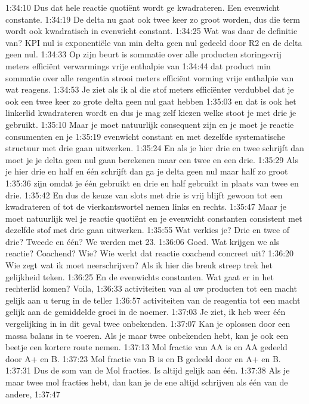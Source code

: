 1:34:10
Dus dat hele reactie quotiënt wordt ge kwadrateren. Een evenwicht constante.
1:34:19
De delta nu gaat ook twee keer zo groot worden, dus die term wordt ook kwadratisch in evenwicht constant.
1:34:25
Wat was daar de definitie van? KPI nul is exponentiële van min delta geen nul gedeeld door R2 en de delta geen nul.
1:34:33
Op zijn beurt is sommatie over alle producten storingsvrij meters efficiënt verwarmings vrije enthalpie van
1:34:44
dat product min sommatie over alle reagentia strooi meters efficiënt vorming vrije enthalpie van wat reagens.
1:34:53
Je ziet als ik al die stof meters efficiënter verdubbel dat je ook een twee keer zo grote delta geen nul gaat hebben
1:35:03
en dat is ook het linkerlid kwadrateren wordt en dus je mag zelf kiezen welke stoot je met drie je gebruikt.
1:35:10
Maar je moet natuurlijk consequent zijn en je moet je reactie consumenten en je
1:35:19
evenwicht constant en met dezelfde systematische structuur met drie gaan uitwerken.
1:35:24
En als je hier drie en twee schrijft dan moet je je delta geen nul gaan berekenen maar een twee en een drie.
1:35:29
Als je hier drie en half en één schrijft dan ga je delta geen nul maar half zo groot
1:35:36
zijn omdat je één gebruikt en drie en half gebruikt in plaats van twee en drie.
1:35:42
En dus de keuze van slots met drie is vrij blijft gewoon tot een kwadrateren of tot de vierkantswortel nemen links en rechts.
1:35:47
Maar je moet natuurlijk wel je reactie quotiënt en je evenwicht constanten consistent met dezelfde stof met drie gaan uitwerken.
1:35:55
Wat verkies je? Drie en twee of drie? Tweede en één? We werden met 23.
1:36:06
Goed. Wat krijgen we als reactie? Coachend? Wie? Wie werkt dat reactie coachend concreet uit?
1:36:20
Wie zegt wat ik moet neerschrijven? Als ik hier die breuk streep trek het gelijkheid teken.
1:36:25
En de evenwichts constanten. Wat gaat er in het rechterlid komen? Voila,
1:36:33
activiteiten van al uw producten tot een macht gelijk aan u terug in de teller
1:36:57
activiteiten van de reagentia tot een macht gelijk aan de gemiddelde groei in de noemer.
1:37:03
Je ziet, ik heb weer één vergelijking in in dit geval twee onbekenden.
1:37:07
Kan je oplossen door een massa balans in te voeren. Als je maar twee onbekenden hebt, kan je ook een beetje een kortere route nemen.
1:37:13
Mol fractie van AA is en AA gedeeld door A+ en B.
1:37:23
Mol fractie van B is en B gedeeld door en A+ en B.
1:37:31
Dus de som van de Mol fracties. Is altijd gelijk aan één.
1:37:38
Als je maar twee mol fracties hebt, dan kan je de ene altijd schrijven als één van de andere,
1:37:47

